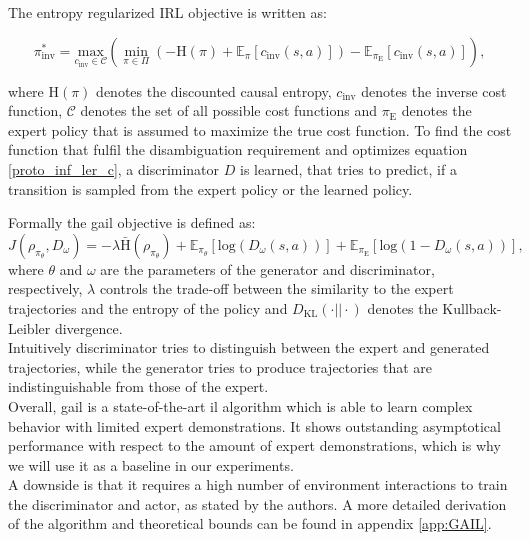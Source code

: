 The entropy regularized IRL objective is written as:

\begin{equation}
    \label{proto_inf_ler_c}
    \pi_{\text{inv}}^* = \underset{c_{\text{inv}} \in \mathcal{C}}{\text{max}} \left( \min_{\pi \in \Pi} \left(- \text{H}(\pi) + \mathbb{E}_{\pi}[c_{\text{inv}}(s, a)] \right) - \mathbb{E}_{\pi_{\text{E}}}[c_{\text{inv}}(s,a)] \right),
\end{equation}
    
where $\text{H}(\pi)$ denotes the discounted causal 
entropy, $c_{\text{inv}}$ denotes the inverse cost function, $\mathcal{C}$ denotes the set of all possible cost functions and $\pi_{\text{E}}$ denotes the expert policy that is assumed to maximize the true cost function.
To find the cost function that fulfil the disambiguation requirement and optimizes equation \ref{proto_inf_ler_c}, a discriminator $D$ is learned, that tries to predict, if a transition is 
sampled from the expert policy or the learned policy.  

Formally the \ac{gail} objective is defined as:
\begin{equation}
    J(\rho_{\pi_{\theta}}, D_{\omega}) =  - \lambda \bar{\text{H}}(\rho_{\pi_{\theta}} ) + \mathbb{E}_{\pi_{\theta}}\left[ \text{log}(D_{\omega}(s,a))\right] + \mathbb{E}_{\pi_{\text{E}}}\left[ \text{log}(1 - D_{\omega}(s,a))\right],
\end{equation}
where $\theta$ and $\omega$ are the parameters of the generator and discriminator, respectively, 
$\lambda$ controls the trade-off between the similarity to the expert trajectories and the entropy of the policy and $D_{\text{KL}}(\cdot || \cdot)$ denotes the Kullback-Leibler divergence. \\
Intuitively discriminator tries to distinguish between the expert and generated trajectories, while the generator tries to produce trajectories that are indistinguishable from those of the expert.\\

Overall, \ac{gail} is a state-of-the-art \ac{il} algorithm which is able to learn complex behavior with limited expert demonstrations. It shows outstanding 
asymptotical performance with respect to the amount of expert demonstrations, which is why we will use it as a baseline in our experiments.\\ 
A downside is that it requires a high number of environment interactions to train the discriminator and actor, as stated by the authors. A more detailed derivation of the algorithm and theoretical 
bounds can be found in appendix \ref{app:GAIL}.


